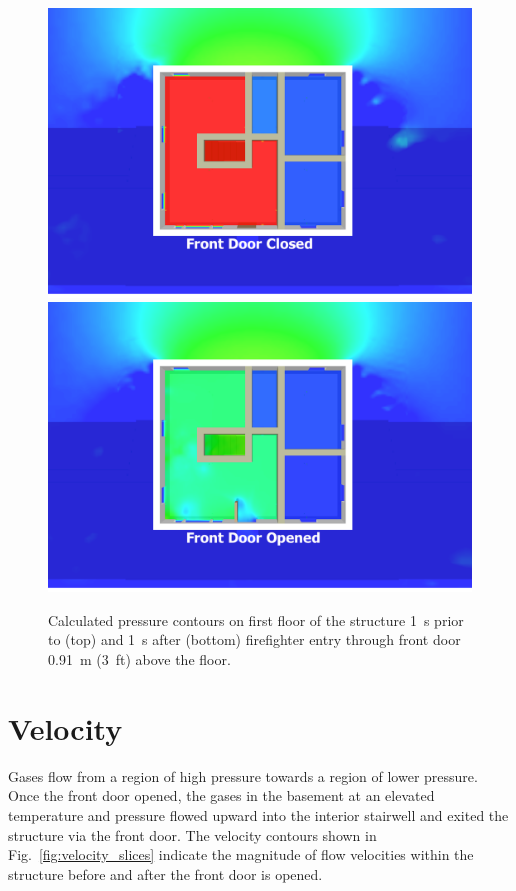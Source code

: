 \documentclass[12pt,oneside]{book}
\begin{document}
\begin{figure}[!ht]
\includegraphics[trim = 1in 1in 1in 1in, clip=true, width=.55\textwidth]{../Figures/pressure_slice_99s}
 \\
\includegraphics[trim = 1in 1in 1in 1in, clip=true, width=.55\textwidth]{../Figures/pressure_slice_101s}

\caption[Calculated pressure on first floor 1~s before and after front door opens]
{Calculated pressure contours on first floor of the structure 1~s prior to (top) and 1~s after (bottom) firefighter entry through front door 0.91~m (3~ft) above the floor.}
\label{fig:pressure_slices}
\end{figure}

\clearpage

\section{Velocity}
\label{velocity}

Gases flow from a region of high pressure towards a region of lower pressure. Once the front door opened, the gases in the basement at an elevated temperature and pressure flowed upward into the interior stairwell and exited the structure via the front door. The velocity contours shown in Fig.~\ref{fig:velocity_slices} indicate the magnitude of flow velocities within the structure before and after the front door is opened.
\end{document}
